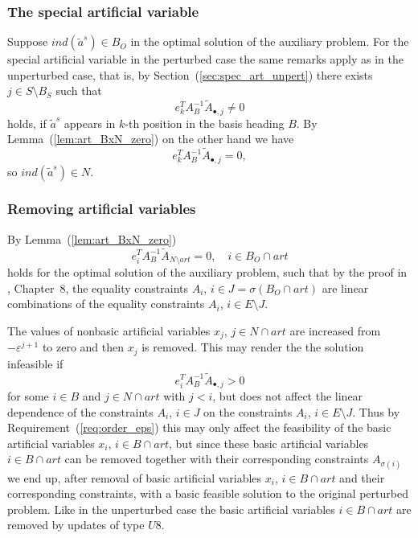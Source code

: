 \documentclass[a4paper]{article}
\begin{document}
\subsubsection{The special artificial variable}
Suppose $ind(\tilde{a}^{s}) \in B_{O}$ in the optimal solution of the auxiliary
problem.
For the special artificial variable in the perturbed case the same remarks
apply as in the unperturbed case, that is, by
Section~(\ref{sec:spec_art_unpert}) there exists
$j \in S \setminus B_{S}$ such that 
\begin{equation*}
e_{k}^{T}A_{B}^{-1}\tilde{A}_{\bullet,j} \neq 0
\end{equation*} 
holds, if $\tilde{a}^{s}$ appears in $k$-th position in the basis heading
$B$. By Lemma~(\ref{lem:art_BxN_zero}) on the other hand we have
\begin{equation*}
e_{k}^{T}A_{B}^{-1}\tilde{A}_{\bullet,j} = 0,
\end{equation*}
so $ind(\tilde{a}^{s}) \in N$.

\subsubsection{Removing artificial variables}
By Lemma~(\ref{lem:art_BxN_zero})
\begin{equation}
e_{i}^{T}A_{B}^{-1}\tilde{A}_{N \setminus art}=0, \quad i \in B_{O} \cap art
\end{equation}
holds for the optimal solution of the auxiliary problem, such that by the proof
in \cite{Chvatal}, Chapter~8, the equality constraints
$A_{i}$, $i \in J=\sigma(B_{O} \cap art)$ are linear combinations of the
equality constraints $A_{i}$, $i \in E \setminus J$.

The values of nonbasic artificial variables $x_{j}$, $j \in N \cap art$ are
increased from $-\varepsilon^{j+1}$ to zero and then $x_{j}$ is removed. This
may render the the solution infeasible if
\begin{equation*}
e_{i}^{T}A_{B}^{-1}\tilde{A}_{\bullet, j} > 0
\end{equation*} 
for some $i \in B$ and $j \in N \cap art$ with $j < i$, but does not affect the
linear dependence of the constraints $A_{i}$, $i \in J$ on the constraints
$A_{i}$, $i \in E \setminus J$.
Thus by Requirement~(\ref{req:order_eps}) this may only affect
the feasibility of the basic artificial variables
$x_{i}$, $i \in B \cap art$, but since these
basic artificial variables $i \in B \cap art$ can be removed together with
their corresponding constraints $A_{\sigma(i)}$ we end up, after removal of
basic artificial variables $x_{i}$, $i \in B \cap art$ and their corresponding
constraints, with a basic feasible
solution to the original perturbed problem. Like in the unperturbed case
the basic artificial variables
$i \in B \cap art$ are removed by updates of type $U8$.    
\end{document}
